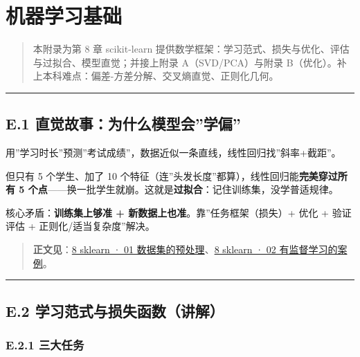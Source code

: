 \chapter{机器学习基础}\label{ux673aux5668ux5b66ux4e60ux57faux7840}

\begin{quote}
本附录为第 8 章 scikit-learn
提供数学框架：学习范式、损失与优化、评估与过拟合、模型直觉；并接上附录
A（SVD/PCA）与附录
B（优化）。补上本科难点：偏差-方差分解、交叉熵直觉、正则化几何。
\end{quote}

\begin{center}\rule{0.5\linewidth}{0.5pt}\end{center}

\section{E.1
直觉故事：为什么模型会''学偏''}\label{e.1-ux76f4ux89c9ux6545ux4e8bux4e3aux4ec0ux4e48ux6a21ux578bux4f1aux5b66ux504f}

用''学习时长''预测''考试成绩''，数据近似一条直线，线性回归找''斜率+截距''。

但只有 5 个学生、加了 10
个特征（连''头发长度''都算），线性回归能\textbf{完美穿过所有 5
个点}------换一批学生就崩。这就是\textbf{过拟合}：记住训练集，没学普适规律。

核心矛盾：\textbf{训练集上够准 + 新数据上也准}。靠''任务框架（损失）+
优化 + 验证评估 + 正则化/适当复杂度''解决。

\begin{quote}
\textbf{正文见}：\href{../../chapters/08-sklearn/01-数据集的预处理.md}{8
sklearn · 01
数据集的预处理}、\href{../../chapters/08-sklearn/02-有监督学习的案例.md}{8
sklearn · 02 有监督学习的案例}。
\end{quote}

\begin{center}\rule{0.5\linewidth}{0.5pt}\end{center}

\section{E.2
学习范式与损失函数（讲解）}\label{e.2-ux5b66ux4e60ux8303ux5f0fux4e0eux635fux5931ux51fdux6570ux8bb2ux89e3}

\subsection{E.2.1 三大任务}\label{e.2.1-ux4e09ux5927ux4efbux52a1}

